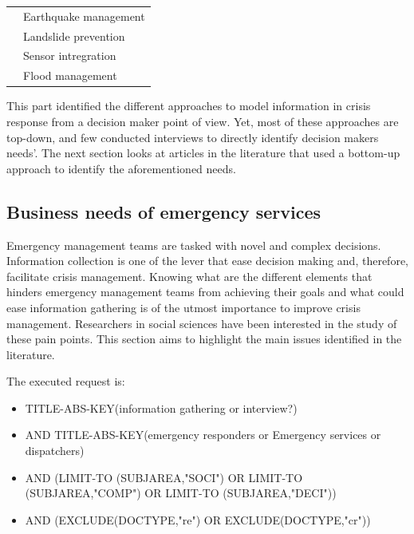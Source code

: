 \begin{table}[bp]
\begin{tabular}{m{} m{}}
        \cite{xuModelingRepresentationEarthquake2014}           & Earthquake management                  \\
        \cite{jungOntologydrivenSlopeModeling2015}              & Landslide prevention                   \\
        \cite{posladSemanticIoTEarly2015}                       & Sensor intregration                    \\
        \cite{qiuIntegratedFloodManagement2017}                 & Flood management                       \\
        \bottomrule
    \end{tabular}
    \label{table:situation-models-main-articles}
\end{table}

This part identified the different approaches to model information in crisis response from a decision maker point of view.
Yet, most of these approaches are top-down, and few conducted interviews to directly identify decision makers needs'.
The next section looks at articles in the literature that used a bottom-up approach to identify the aforementioned needs.

\subsection{Business needs of emergency services}
Emergency management teams are tasked with novel and complex decisions.
Information collection is one of the lever that ease decision making and, therefore,
facilitate crisis management.
Knowing what are the different elements that hinders emergency management teams from
achieving their goals and what could ease information gathering is of the utmost importance to improve crisis management.
Researchers in social sciences have been interested in the study of these pain points.
This section aims to highlight the main issues identified in the literature.

The executed request is:

\begin{itemize}
    \item TITLE-ABS-KEY({information gathering} or interview?)
    \item AND TITLE-ABS-KEY({emergency responders} or {Emergency services} or {dispatchers})
    \item AND (LIMIT-TO (SUBJAREA,"SOCI") OR LIMIT-TO (SUBJAREA,"COMP") OR LIMIT-TO (SUBJAREA,"DECI"))
    \item AND (EXCLUDE(DOCTYPE,"re") OR EXCLUDE(DOCTYPE,"cr"))
\end{itemize}

